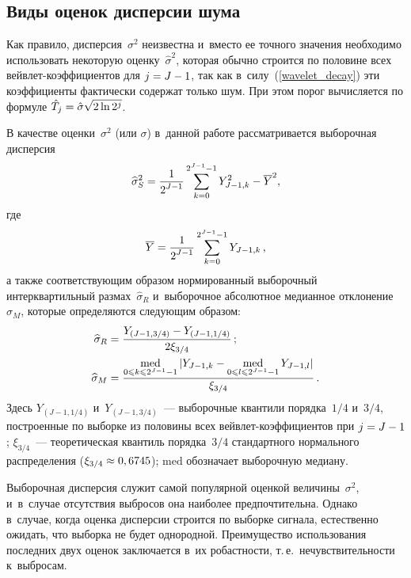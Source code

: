 \begin{multicols}{2}
\section{Виды оценок дисперсии шума}

Как правило, дисперсия~$\sigma^2$ неизвестна и~вместо ее точного значения 
необходимо использовать некоторую оценку~$\hat{\sigma}^2$, которая обычно 
строится по половине всех вейв\-лет-ко\-эф\-фи\-ци\-ен\-тов для $j\hm=J\hm-1$, 
так как в~силу~(\ref{wavelet_decay}) эти коэффициенты фактически содержат только шум. 
При этом порог вычисляется по формуле $\hat{T}_j\hm=\hat{\sigma}\sqrt{2\ln 2^j}$.

В качестве оценки~$\sigma^2$ (или $\sigma$) в~данной работе 
рассматривается выборочная дисперсия
\begin{equation}
\label{SampleVarianceDef}
\widehat{\sigma}_S^2=\displaystyle\frac{\displaystyle 1\mathstrut}{\displaystyle 2^{J-1}\mathstrut}
\sum\limits_{k=0}^{2^{J-1}-1}Y_{J-1,k}^2-\overline{Y}^2,
\end{equation}
где
\begin{equation*}
\overline{Y}=\displaystyle\frac{\displaystyle 1\mathstrut}{\displaystyle 2^{J-1}\mathstrut}\sum\limits_{k=0}^{2^{J-1}-1}Y_{J-1,k}\,,
\end{equation*}
а также соответствующим образом нормированный выборочный интерквартильный 
размах~$\widehat{\sigma}_{R}$ и~выборочное абсолютное медианное 
отклонение~$\widehat{\sigma}_{M}$, которые определяются сле\-ду\-ющим образом:
\begin{align}
\widehat{\sigma}_{R}&=\displaystyle\frac{\displaystyle Y_{(J-1,3/4)}-Y_{(J-1,1/4)}\mathstrut}{\displaystyle 2\xi_{3/4}\mathstrut}\,;
\label{IQR_Definition}
\\
\widehat{\sigma}_{M}&=\displaystyle\frac{\displaystyle \mathop{\mbox{med}}\limits_{0\leqslant k\leqslant 2^{J-1}-1}|Y_{J-1,k}-\mathop{\mbox{med}}\limits_{0\leqslant l\leqslant 2^{J-1}-1} Y_{J-1,l}|\mathstrut}{\displaystyle \xi_{3/4}\mathstrut}\,.
\label{MAD_Definition}
\end{align}
Здесь $Y_{(J-1,1/4)}$ и~$Y_{(J-1,3/4)}$~--- выборочные квантили порядка~$1/4$ и~$3/4$, 
построенные по выборке из половины всех вейв\-лет-ко\-эф\-фи\-ци\-ен\-тов при 
$j\hm=J\hm-1$; $\xi_{3/4}$~--- теоретическая квантиль порядка~$3/4$ 
стандартного нормального распределения ($\xi_{3/4}\hm\approx0,6745$); $\mbox{med}$ 
обозначает выборочную медиану.

Выборочная дисперсия служит самой популярной оценкой величины~$\sigma^2$, и~в~случае 
отсутствия выбросов она наиболее предпочтительна. Однако в~случае, когда 
оценка дисперсии строится по выборке сигнала, естественно ожидать, 
что выборка не будет однородной. Преимущество использования последних 
двух оценок заключается в~их ро\-баст\-ности, т.\,е.\ нечувствительности к~выбросам.


\end{multicols}
